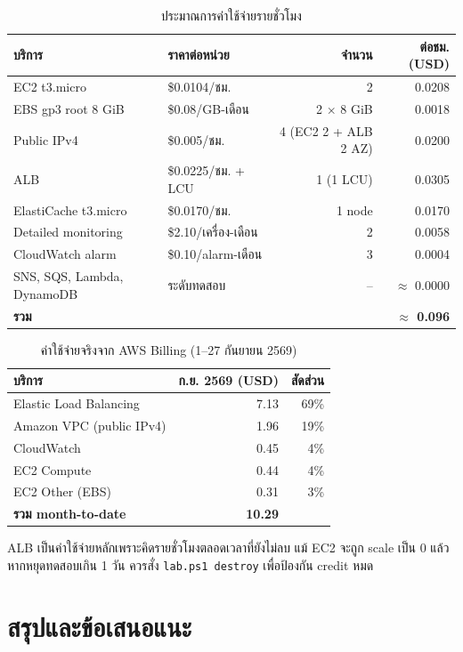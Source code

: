 \documentclass[12pt,a4paper]{report}
\begin{document}
\begin{table}[H]
\centering
\caption{ประมาณการค่าใช้จ่ายรายชั่วโมง}
\begin{tabularx}{\textwidth}{lXrr}
\toprule
\textbf{บริการ} & \textbf{ราคาต่อหน่วย} & \textbf{จำนวน} & \textbf{ต่อชม. (USD)} \\
\midrule
EC2 t3.micro & \$0.0104/ชม. & 2 & 0.0208 \\
EBS gp3 root 8 GiB & \$0.08/GB-เดือน & 2 $\times$ 8 GiB & 0.0018 \\
Public IPv4 & \$0.005/ชม. & 4 (EC2 2 + ALB 2 AZ) & 0.0200 \\
ALB & \$0.0225/ชม. + LCU & 1 (1 LCU) & 0.0305 \\
ElastiCache t3.micro & \$0.0170/ชม. & 1 node & 0.0170 \\
Detailed monitoring & \$2.10/เครื่อง-เดือน & 2 & 0.0058 \\
CloudWatch alarm & \$0.10/alarm-เดือน & 3 & 0.0004 \\
SNS, SQS, Lambda, DynamoDB & ระดับทดสอบ & -- & $\approx$ 0.0000 \\
\midrule
\textbf{รวม} & & & \textbf{$\approx$ 0.096} \\
\bottomrule
\end{tabularx}
\end{table}

\begin{table}[H]
\centering
\caption{ค่าใช้จ่ายจริงจาก AWS Billing (1--27 กันยายน 2569)}
\begin{tabularx}{\textwidth}{lrr}
\toprule
\textbf{บริการ} & \textbf{ก.ย. 2569 (USD)} & \textbf{สัดส่วน} \\
\midrule
Elastic Load Balancing & 7.13 & 69\% \\
Amazon VPC (public IPv4) & 1.96 & 19\% \\
CloudWatch & 0.45 & 4\% \\
EC2 Compute & 0.44 & 4\% \\
EC2 Other (EBS) & 0.31 & 3\% \\
\midrule
\textbf{รวม month-to-date} & \textbf{10.29} & \\
\bottomrule
\end{tabularx}
\end{table}

ALB เป็นค่าใช้จ่ายหลักเพราะคิดรายชั่วโมงตลอดเวลาที่ยังไม่ลบ แม้ EC2 จะถูก scale เป็น 0 แล้ว หากหยุดทดสอบเกิน 1 วัน ควรสั่ง \texttt{lab.ps1 destroy} เพื่อป้องกัน credit หมด

\chapter{สรุปและข้อเสนอแนะ}
\end{document}
